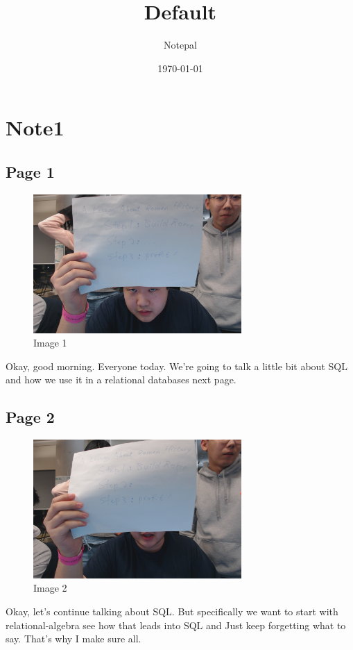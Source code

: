 \documentclass{article}%
\title{Default}%
\author{Notepal}%
\date{\today}%
\begin{document}
%
\normalsize%
\maketitle%
\section{Note1}%
\label{sec:Note1}%
\subsection{Page 1}%
\label{subsec:Page 1}%


\begin{figure}[h!]%
\centering%
\includegraphics[width=300px]{../Notes/IntroductiontoDatabases/Note1/image1.jpg}%
\caption{Image 1}%
\end{figure}

%
Okay, good morning. Everyone today. We're going to talk a little bit about SQL and how we use it in a relational databases next page. \newline%

%
\subsection{Page 2}%
\label{subsec:Page 2}%


\begin{figure}[h!]%
\centering%
\includegraphics[width=300px]{../Notes/IntroductiontoDatabases/Note1/image2.jpg}%
\caption{Image 2}%
\end{figure}

%
Okay, let's continue talking about SQL. But specifically we want to start with relational{-}algebra see how that leads into SQL and \newline%
 Just keep forgetting what to say. That's why I make sure all. \newline%

%
\end{document}
